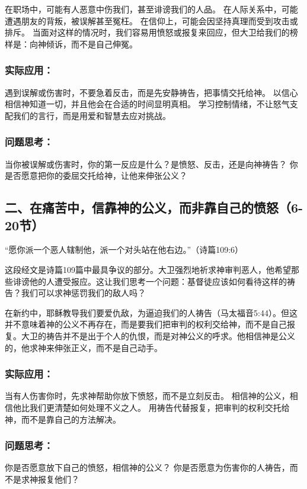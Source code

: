 \documentclass[a4paper, 12pt]{article}
\begin{document}
在职场中，可能有人恶意中伤我们，甚至诽谤我们的人品。
在人际关系中，可能遭遇朋友的背叛，被误解甚至冤枉。
在信仰上，可能会因坚持真理而受到攻击或排斥。
当面对这样的情况时，我们容易用愤怒或报复来回应，但大卫给我们的榜样是：向神倾诉，而不是自己伸冤。

\subsubsection*{实际应用：}

遇到误解或伤害时，不要急着反击，而是先安静祷告，把事情交托给神。
以信心相信神知道一切，并且他会在合适的时间显明真相。
学习控制情绪，不让怒气支配我们的言行，而是用爱和智慧去应对挑战。
\subsubsection*{问题思考：}

当你被误解或伤害时，你的第一反应是什么？是愤怒、反击，还是向神祷告？
你是否愿意把你的委屈交托给神，让他来伸张公义？
\subsection*{二、在痛苦中，信靠神的公义，而非靠自己的愤怒（6-20节）}
“愿你派一个恶人辖制他，派一个对头站在他右边。”（诗篇109:6）

这段经文是诗篇109篇中最具争议的部分。大卫强烈地祈求神审判恶人，他希望那些诽谤他的人遭受报应。这让我们思考一个问题：基督徒应该如何看待这样的祷告？我们可以求神惩罚我们的敌人吗？

在新约中，耶稣教导我们要爱仇敌，为逼迫我们的人祷告（马太福音5:44）。但这并不意味着神的公义不再存在，而是要我们把审判的权利交给神，而不是自己报复。大卫的祷告并不是出于个人的仇恨，而是对神公义的呼求。他相信神是公义的，他求神来伸张正义，而不是自己动手。

\subsubsection*{实际应用：}

当有人伤害你时，先求神帮助你放下愤怒，而不是立刻反击。
相信神的公义，相信他比我们更清楚如何处理不义之人。
用祷告代替报复，把审判的权利交托给神，而不是靠自己的方法解决。
\subsubsection*{问题思考：}

你是否愿意放下自己的愤怒，相信神的公义？
你是否愿意为伤害你的人祷告，而不是求神报复他们？
\end{document}
